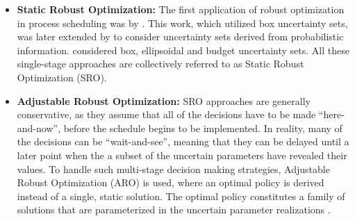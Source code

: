 \begin{itemize}
\item \textbf{Static Robust Optimization: } The first application of robust optimization in process scheduling was by \cite{LIN20041069}. This work, which utilized box uncertainty sets, was later extended by \cite{JANAK2007171} to consider uncertainty sets derived from probabilistic information. \cite{LiIerapetritou} considered box, ellipsoidal and budget uncertainty sets. All these single-stage approaches are collectively referred to as Static Robust Optimization (SRO).

\item \textbf{Adjustable Robust Optimization: } SRO approaches are generally conservative, as they assume that all of the decisions have to be made 	``here-and-now'', before the schedule begins to be implemented. In reality, many of the decisions can be ``wait-and-see'', meaning that they can be delayed until a later point when the a subset of the uncertain parameters have revealed their values. To handle such multi-stage decision making strategies, Adjustable Robust Optimization (ARO) is used, where an optimal policy is derived instead of a single, static solution. The optimal policy constitutes a family of solutions that are parameterized in the uncertain parameter realizations \citep{lappas}.

\end{itemize}
